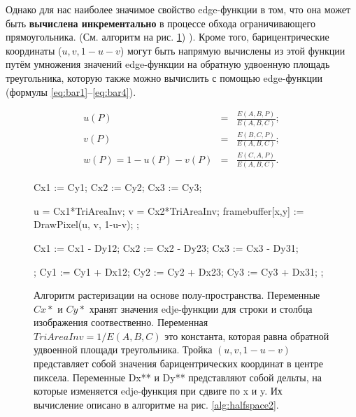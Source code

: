 \documentclass[12pt,subf,href,colorlinks=true]{article}
\begin{document}
Однако для нас наиболее значимое свойство edge-функции в том, что она может быть \textbf{вычислена инкрементально} в процессе обхода ограничивающего прямоугольника. (См. алгоритм на рис. \ref{alg:halfspace}) \cite{Pineda}). Кроме того, барицентрические координаты ($u,v,1-u-v$) могут быть напрямую вычислены из этой функции путём умножения значений edge-функции на обратную удвоенную площадь треугольника, которую также можно вычислить с помощью edge-функции (формулы \ref{eq:bar1}--\ref{eq:bar4}).

\begin{eqnarray}\label{eq:bar1}
	u(P)        &=& \frac{E(A,B,P)}{E(A,B,C)} ;\\ \label{eq:bar2}
	v(P)        &=& \frac{E(B,C,P)}{E(A,B,C)} ;\\ \label{eq:bar3}
	w(P) = 1-u(P)-v(P) &=& \frac{E(C,A,P)}{E(A,B,C)}. \label{eq:bar4}
\end{eqnarray}

\begin{figure}[h]
	\begin{algorithmic}[1]
		
		\State Cx1 := Cy1; 
		\State Cx2 := Cy2; 
		\State Cx3 := Cy3; 
		
		
		\State u = Cx1*TriAreaInv;
		\State v = Cx2*TriAreaInv;
		\State framebuffer[x,y] := DrawPixel(u, v, 1-u-v);
		\EndIf;
		
		\State Cx1 := Cx1 - Dy12;
		\State Cx2 := Cx2 - Dy23;
		\State Cx3 := Cx3 - Dy31;
		
		\EndFor;
		\State Cy1 := Cy1 + Dx12;
		\State Cy2 := Cy2 + Dx23;
		\State Cy3 := Cy3 + Dx31; 	
		\EndFor;
		
	\end{algorithmic}
	\caption{Алгоритм растеризации на основе полу-пространства. Переменные $Cx*$ и $Cy*$ хранят значения edje-функции для строки и столбца изображения соотвественно. Переменная  $TriAreaInv=1/E(A,B,C)$ это константа, которая равна обратной удвоенной площади треугольника. Тройка $(u,v, 1-u-v)$ представляет собой значения барицентрических координат в центре пиксела.
    Переменные Dx** и Dy** представляют собой дельты, на которые изменяется edje-функция при сдвиге по x и y. Их вычисление описано в алгоритме на рис. \ref{alg:halfspace2}.	
 }\label{alg:halfspace}
\end{figure}
\end{document}
